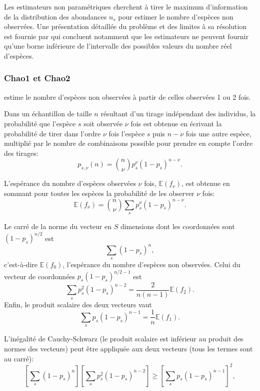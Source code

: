 \documentclass[
  11pt,
  american,
  a4paper,
  extrafontsizes,onecolumn,openright
  ]{memoir}
\begin{document}
Les estimateurs non paramétriques cherchent à tirer le maximum d'information de la distribution des abondances \(n_s\) pour estimer le nombre d'espèces non observées.
Une présentation détaillée du problème et des limites à sa résolution est fournie par \textcite{Mao2005} qui concluent notamment que les estimateurs ne peuvent fournir qu'une borne inférieure de l'intervalle des possibles valeurs du nombre réel d'espèces.

\subsubsection{Chao1 et Chao2}\label{chao1-et-chao2}

\textcite{Chao1984} estime le nombre d'espèces non observées à partir de celles observées 1 ou 2 fois.

Dans un échantillon de taille \(n\) résultant d'un tirage indépendant des individus, la probabilité que l'espèce \(s\) soit observée \(\nu\) fois est obtenue en écrivant la probabilité de tirer dans l'ordre \(\nu\) fois l'espèce \(s\) puis \(n-\nu\) fois une autre espèce, multiplié par le nombre de combinaisons possible pour prendre en compte l'ordre des tirages:
\begin{equation}
  \label{eq:psnu}
  p_{s, \nu}(n) = \binom{n}{\nu} {p_s^\nu \left( 1 - p_s \right)^{n - \nu}}.
\end{equation}

L'espérance du nombre d'espèces observées \(\nu\) fois, \({\mathbb E}(f_{\nu})\), est obtenue en sommant pour toutes les espèces la probabilité de les observer \(\nu\) fois:
\begin{equation}
  \label{eq:Esnnu}
  {\mathbb E}\left( f_{\nu} \right) = \binom{n}{\nu} \sum_s{p_s^\nu \left( 1 - p_s \right)^{n - \nu}}.
\end{equation}

Le carré de la norme du vecteur en \(S\) dimensions dont les coordonnées sont \((1 - p_s)^{n / 2}\) est
\[\sum_s{(1 - p_s)^n},\]
c'est-à-dire \({\mathbb E}(f_{0})\), l'espérance du nombre d'espèces non observées.
Celui du vecteur de coordonnées \(p_s (1 - p_s)^{n / 2 - 1}\) est
\[\sum_s{p_s^2 (1 - p_s)^{n - 2}} = \frac{2}{n (n - 1)}{\mathbb E}(f_{2}).\]
Enfin, le produit scalaire des deux vecteurs vaut
\[\sum_s{p_s (1 - p_s)^{n - 1}} = \frac{1}{n}{\mathbb E}(f_{1}).\]

L'inégalité de Cauchy-Schwarz (le produit scalaire est inférieur au produit des normes des vecteurs) peut être appliquée aux deux vecteurs (tous les termes sont au carré):
\begin{equation}
  \label{eq:CauchySchwarz}
  \left[ \sum_s{(1 - p_s)^n} \right] \left[ \sum_s{p_s^2 (1 - p_s)^{n-2}} \right] 
   \ge \left[ \sum_s{p_s (1 - p_s)^{n-1}} \right]^2,
\end{equation}
\end{document}
